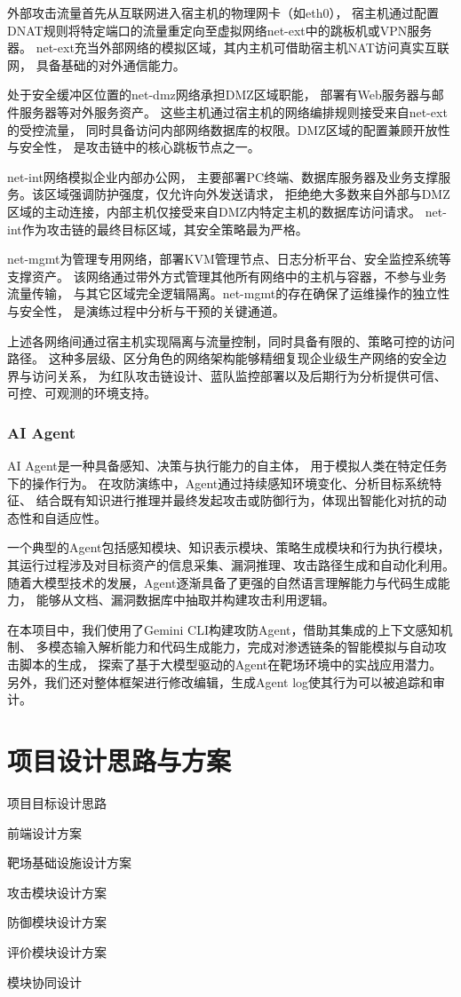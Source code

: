 \documentclass[lang=cn,10pt]{elegantbook}
\begin{document}
外部攻击流量首先从互联网进入宿主机的物理网卡（如eth0），
宿主机通过配置DNAT规则将特定端口的流量重定向至虚拟网络net-ext中的跳板机或VPN服务器。
net-ext充当外部网络的模拟区域，其内主机可借助宿主机NAT访问真实互联网，
具备基础的对外通信能力。

处于安全缓冲区位置的net-dmz网络承担DMZ区域职能，
部署有Web服务器与邮件服务器等对外服务资产。
这些主机通过宿主机的网络编排规则接受来自net-ext的受控流量，
同时具备访问内部网络数据库的权限。DMZ区域的配置兼顾开放性与安全性，
是攻击链中的核心跳板节点之一。

net-int网络模拟企业内部办公网，
主要部署PC终端、数据库服务器及业务支撑服务。该区域强调防护强度，仅允许向外发送请求，
拒绝绝大多数来自外部与DMZ区域的主动连接，内部主机仅接受来自DMZ内特定主机的数据库访问请求。
net-int作为攻击链的最终目标区域，其安全策略最为严格。

net-mgmt为管理专用网络，部署KVM管理节点、日志分析平台、安全监控系统等支撑资产。
该网络通过带外方式管理其他所有网络中的主机与容器，不参与业务流量传输，
与其它区域完全逻辑隔离。net-mgmt的存在确保了运维操作的独立性与安全性，
是演练过程中分析与干预的关键通道。

上述各网络间通过宿主机实现隔离与流量控制，同时具备有限的、策略可控的访问路径。
这种多层级、区分角色的网络架构能够精细复现企业级生产网络的安全边界与访问关系，
为红队攻击链设计、蓝队监控部署以及后期行为分析提供可信、可控、可观测的环境支持。


\subsection{AI Agent}

AI Agent是一种具备感知、决策与执行能力的自主体，
用于模拟人类在特定任务下的操作行为。
在攻防演练中，Agent通过持续感知环境变化、分析目标系统特征、
结合既有知识进行推理并最终发起攻击或防御行为，体现出智能化对抗的动态性和自适应性。

一个典型的Agent包括感知模块、知识表示模块、策略生成模块和行为执行模块，
其运行过程涉及对目标资产的信息采集、漏洞推理、攻击路径生成和自动化利用。
随着大模型技术的发展，Agent逐渐具备了更强的自然语言理解能力与代码生成能力，
能够从文档、漏洞数据库中抽取并构建攻击利用逻辑。

在本项目中，我们使用了Gemini CLI构建攻防Agent，借助其集成的上下文感知机制、
多模态输入解析能力和代码生成能力，完成对渗透链条的智能模拟与自动攻击脚本的生成，
探索了基于大模型驱动的Agent在靶场环境中的实战应用潜力。
另外，我们还对整体框架进行修改编辑，生成Agent log使其行为可以被追踪和审计。


\chapter{项目设计思路与方案}
\begin{introduction}
  \item 项目目标设计思路
  \item 前端设计方案
  \item 靶场基础设施设计方案
  \item 攻击模块设计方案
  \item 防御模块设计方案
  \item 评价模块设计方案
  \item 模块协同设计
\end{introduction}
\end{document}
